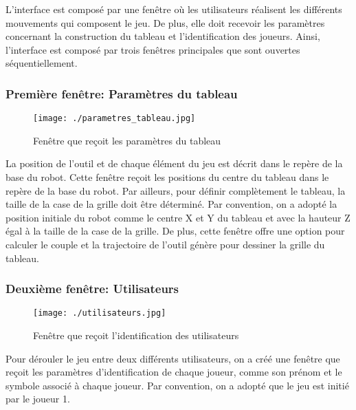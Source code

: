 \label{res_IHM}

L’interface est composé par une fenêtre où les utilisateurs réalisent les différents mouvements qui composent le jeu. De plus, elle doit recevoir les paramètres concernant la construction du tableau et l’identification des joueurs. Ainsi, l’interface est composé par trois fenêtres principales que sont ouvertes séquentiellement. 

\subsubsection{Première fenêtre: Paramètres du tableau}\label{Fen1}

\begin{figure}[H]
	\begin{center}
		\captionsetup{justification=centering,margin=1cm}	
		\texttt{[image: ./parametres\_tableau.jpg]}
		\caption{Fenêtre que reçoit les paramètres du tableau}
		\label{fig:Fen1}
	\end{center}
\end{figure}

La position de l’outil et de chaque élément du jeu est décrit dans le repère de la base du robot. Cette fenêtre reçoit les positions du centre du tableau dans le repère de la base du robot. Par ailleurs, pour définir complètement le tableau, la taille de la case de la grille doit être déterminé. Par convention, on a adopté la position initiale du robot comme le centre X et Y du tableau et avec la hauteur Z égal à la taille de la case de la grille. De plus, cette fenêtre offre une option pour calculer le couple et la trajectoire de l’outil génère pour dessiner la grille du tableau. 
 

\subsubsection{Deuxième fenêtre: Utilisateurs}\label{Fen2} 

\begin{figure}[H]
	\begin{center}	
		\captionsetup{justification=centering,margin=1cm}
		\texttt{[image: ./utilisateurs.jpg]}
		\caption{Fenêtre que reçoit l'identification des utilisateurs}
		\label{fig:Fen2}
	\end{center}
\end{figure}
\newpage
Pour dérouler le jeu entre deux différents utilisateurs, on a créé une fenêtre que reçoit les paramètres d’identification de chaque joueur, comme son prénom et le symbole associé à chaque joueur. Par convention, on a adopté que le jeu est initié par le joueur 1. 

